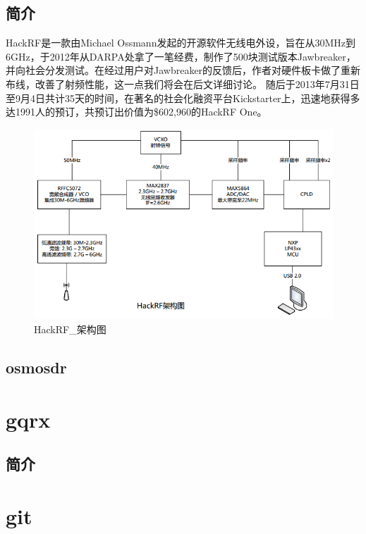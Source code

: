 	\subsection{简介}
	\par HackRF是一款由Michael Ossmann发起的开源软件无线电外设，旨在从30MHz到6GHz，于2012年从DARPA处拿了一笔经费，制作了500块测试版本Jawbreaker，并向社会分发测试。在经过用户对Jawbreaker的反馈后，作者对硬件板卡做了重新布线，改善了射频性能，这一点我们将会在后文详细讨论。 随后于2013年7月31日至9月4日共计35天的时间，在著名的社会化融资平台Kickstarter上，迅速地获得多达1991人的预订，共预订出价值为\$602,960的HackRF One。
	\begin{figure}[htb]
	\centering
	\includegraphics{figures/HackRF_架构.png}
	\caption{
		HackRF\_架构图
	}
	\label{fig:HackRF_架构}
	\end{figure}
	\subsection{osmosdr}
\section{gqrx}
	\subsection{简介}
\section{git}
